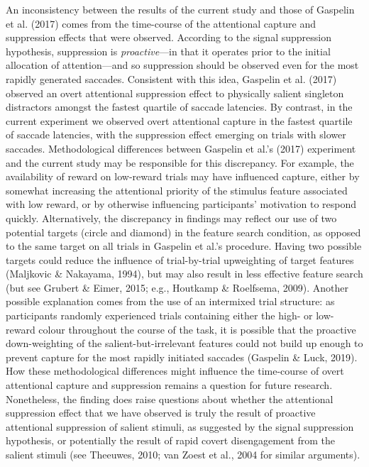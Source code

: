 \documentclass[man, a4paper, noextraspace, 11pt,floatsintext]{apa6}
\theoremstyle{definition}
\theoremstyle{definition}
\theoremstyle{definition}
\theoremstyle{remark}
\begin{document}
An inconsistency between the results of the current study and those of
Gaspelin et al. (2017) comes from the time-course of the attentional
capture and suppression effects that were observed. According to the
signal suppression hypothesis, suppression is \emph{proactive}---in that
it operates prior to the initial allocation of attention---and so
suppression should be observed even for the most rapidly generated
saccades. Consistent with this idea, Gaspelin et al. (2017) observed an
overt attentional suppression effect to physically salient singleton
distractors amongst the fastest quartile of saccade latencies. By
contrast, in the current experiment we observed overt attentional
capture in the fastest quartile of saccade latencies, with the
suppression effect emerging on trials with slower saccades.
Methodological differences between Gaspelin et al.'s (2017) experiment
and the current study may be responsible for this discrepancy. For
example, the availability of reward on low-reward trials may have
influenced capture, either by somewhat increasing the attentional
priority of the stimulus feature associated with low reward, or by
otherwise influencing participants' motivation to respond quickly.
Alternatively, the discrepancy in findings may reflect our use of two
potential targets (circle and diamond) in the feature search condition,
as opposed to the same target on all trials in Gaspelin et al.'s
procedure. Having two possible targets could reduce the influence of
trial-by-trial upweighting of target features (Maljkovic \& Nakayama,
1994), but may also result in less effective feature search (but see
Grubert \& Eimer, 2015; e.g., Houtkamp \& Roelfsema, 2009). Another
possible explanation comes from the use of an intermixed trial
structure: as participants randomly experienced trials containing either
the high- or low-reward colour throughout the course of the task, it is
possible that the proactive down-weighting of the salient-but-irrelevant
features could not build up enough to prevent capture for the most
rapidly initiated saccades (Gaspelin \& Luck, 2019). How these
methodological differences might influence the time-course of overt
attentional capture and suppression remains a question for future
research. Nonetheless, the finding does raise questions about whether
the attentional suppression effect that we have observed is truly the
result of proactive attentional suppression of salient stimuli, as
suggested by the signal suppression hypothesis, or potentially the
result of rapid covert disengagement from the salient stimuli (see
Theeuwes, 2010; van Zoest et al., 2004 for similar arguments).
\end{document}

